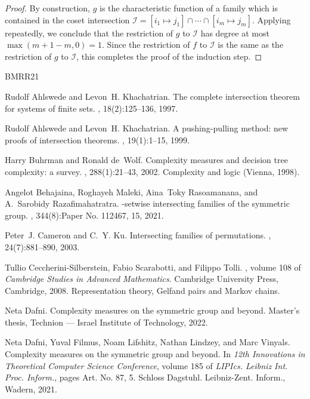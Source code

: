 \documentclass[10pt,a4paper]{article}
\theoremstyle{definition}
\providecommand{\coset}[2]{[#1 \mapsto #2]}
\begin{document}
\begin{proof}
By construction, $g$ is the characteristic function of a family which is contained in the coset intersection $\mathcal{I} = \coset{i_1}{j_1} \cap \cdots \cap \coset{i_m}{j_m}$. Applying  repeatedly, we conclude that the restriction of $g$ to $\mathcal{I}$ has degree at most $\max(m+1-m,0) = 1$. Since the restriction of $f$ to $\mathcal{I}$ is the same as the restriction of $g$ to $\mathcal{I}$, this completes the proof of the induction step.
\end{proof}

\newcommand{\etalchar}[1]{$^{#1}$}
\begin{thebibliography}{BMRR21}

Rudolf Ahlswede and Levon~H. Khachatrian.
\newblock The complete intersection theorem for systems of finite sets.
, 18(2):125--136, 1997.

Rudolf Ahlswede and Levon~H. Khachatrian.
\newblock A pushing-pulling method: new proofs of intersection theorems.
, 19(1):1--15, 1999.

Harry Buhrman and Ronald de~Wolf.
\newblock Complexity measures and decision tree complexity: a survey.
, 288(1):21--43, 2002.
\newblock Complexity and logic (Vienna, 1998).

Angelot Behajaina, Roghayeh Maleki, Aina~Toky Rasoamanana, and A.~Sarobidy
  Razafimahatratra.
-setwise intersecting families of the symmetric group.
, 344(8):Paper No. 112467, 15, 2021.

Peter~J. Cameron and C.~Y. Ku.
\newblock Intersecting families of permutations.
, 24(7):881--890, 2003.

Tullio Ceccherini-Silberstein, Fabio Scarabotti, and Filippo Tolli.
, volume 108 of {\em
  Cambridge Studies in Advanced Mathematics}.
\newblock Cambridge University Press, Cambridge, 2008.
\newblock Representation theory, Gelfand pairs and Markov chains.

Neta Dafni.
\newblock Complexity measures on the symmetric group and beyond.
\newblock Master's thesis, Technion --- Israel Institute of Technology, 2022.

\bibitem[DFL{\etalchar{+}}21]{DFLLV}
Neta Dafni, Yuval Filmus, Noam Lifshitz, Nathan Lindzey, and Marc Vinyals.
\newblock Complexity measures on the symmetric group and beyond.
\newblock In {\em 12th {I}nnovations in {T}heoretical {C}omputer {S}cience
  {C}onference}, volume 185 of {\em LIPIcs. Leibniz Int. Proc. Inform.}, pages
  Art. No. 87, 5. Schloss Dagstuhl. Leibniz-Zent. Inform., Wadern, 2021.


\end{thebibliography}
\end{document}
